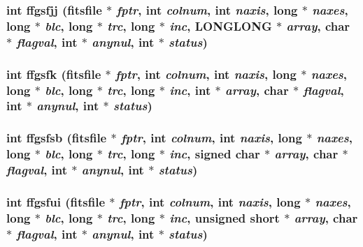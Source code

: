 \subsubsection{\setlength{\rightskip}{0pt plus 5cm}int ffgsfjj (\bf{fitsfile} $\ast$ {\em fptr}, int {\em colnum}, int {\em naxis}, long $\ast$ {\em naxes}, long $\ast$ {\em blc}, long $\ast$ {\em trc}, long $\ast$ {\em inc}, \bf{LONGLONG} $\ast$ {\em array}, char $\ast$ {\em flagval}, int $\ast$ {\em anynul}, int $\ast$ {\em status})}\label{test_2shm__client_2fitsio_8h_928fae8967c2f8fbbd25314487385b55}


\subsubsection{\setlength{\rightskip}{0pt plus 5cm}int ffgsfk (\bf{fitsfile} $\ast$ {\em fptr}, int {\em colnum}, int {\em naxis}, long $\ast$ {\em naxes}, long $\ast$ {\em blc}, long $\ast$ {\em trc}, long $\ast$ {\em inc}, int $\ast$ {\em array}, char $\ast$ {\em flagval}, int $\ast$ {\em anynul}, int $\ast$ {\em status})}\label{test_2shm__client_2fitsio_8h_0efb49c901a562ffccd69c4c87c47387}


\subsubsection{\setlength{\rightskip}{0pt plus 5cm}int ffgsfsb (\bf{fitsfile} $\ast$ {\em fptr}, int {\em colnum}, int {\em naxis}, long $\ast$ {\em naxes}, long $\ast$ {\em blc}, long $\ast$ {\em trc}, long $\ast$ {\em inc}, signed char $\ast$ {\em array}, char $\ast$ {\em flagval}, int $\ast$ {\em anynul}, int $\ast$ {\em status})}\label{test_2shm__client_2fitsio_8h_e824866f99503c243fed85e3cce3aaf4}


\subsubsection{\setlength{\rightskip}{0pt plus 5cm}int ffgsfui (\bf{fitsfile} $\ast$ {\em fptr}, int {\em colnum}, int {\em naxis}, long $\ast$ {\em naxes}, long $\ast$ {\em blc}, long $\ast$ {\em trc}, long $\ast$ {\em inc}, unsigned short $\ast$ {\em array}, char $\ast$ {\em flagval}, int $\ast$ {\em anynul}, int $\ast$ {\em status})}\label{test_2shm__client_2fitsio_8h_c591c8ea9be72a7c242e8f102f6ba3b4}


